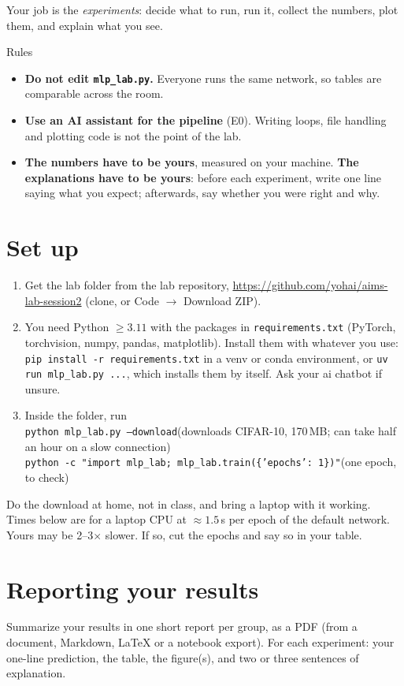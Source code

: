 \documentclass[11pt]{article}
\newcommand{\code}[1]{\texttt{#1}}
\newcounter{exp}
\begin{document}
Your job is the \emph{experiments}: decide what to run, run it, collect the numbers, plot them, and explain what you see.

\begin{rules}{Rules}
\begin{itemize}
  \item \textbf{Do not edit \code{mlp\_lab.py}.} Everyone runs the same network, so tables are comparable across the room.
  \item \textbf{Use an AI assistant for the pipeline} (E0). Writing loops, file handling and plotting code is not the point of the lab.
  \item \textbf{The numbers have to be yours}, measured on your machine. \textbf{The explanations have to be yours}: before each experiment, write one line saying what you expect; afterwards, say whether you were right and why.
\end{itemize}
\end{rules}

\section*{Set up}
\begin{enumerate}
  \item Get the lab folder from the lab repository, \url{https://github.com/yohai/aims-lab-session2} (clone, or Code $\to$ Download ZIP).
  \item You need Python $\ge3.11$ with the packages in \code{requirements.txt} (PyTorch, torchvision, numpy, pandas, matplotlib). Install them with whatever you use: \code{pip install -r requirements.txt} in a venv or conda environment, or \code{uv run mlp\_lab.py ...}, which installs them by itself. Ask your ai chatbot if unsure.
  \item Inside the folder, run\\
  \code{python mlp\_lab.py --download}\quad (downloads CIFAR-10, 170\,MB; can take half an hour on a slow connection)\\
  \code{python -c "import mlp\_lab; mlp\_lab.train(\{'epochs': 1\})"}\quad (one epoch, to check)
\end{enumerate}
Do the download at home, not in class, and bring a laptop with it working.
Times below are for a laptop CPU at $\approx1.5$\,s per epoch of the default network. Yours may be 2--3$\times$ slower. If so, cut the epochs and say so in your table.

\section*{Reporting your results}
Summarize your results in one short report per group, as a PDF (from a document, Markdown, \LaTeX{} or a notebook export). For each experiment: your one-line prediction, the table, the figure(s), and two or three sentences of explanation.
\end{document}
